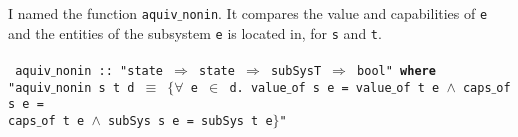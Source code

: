 \begin{enumerate}
I named the function \texttt{aquiv$\_$nonin}. It compares the value and capabilities of \texttt{e} and the entities of the subsystem \texttt{e} is located in, for \texttt{s} and \texttt{t}. \\ \\
{
\texttt{
aquiv$\_$nonin :: "state $\Rightarrow$ state $\Rightarrow$ subSysT $\Rightarrow$ bool" \textbf{where} \\
"aquiv$\_$nonin s t d $\equiv$ $\{\forall$ e $\in$ d. value$\_$of s e = value$\_$of t e $\wedge$ caps$\_$of s e = \\
 caps$\_$of t e $\wedge$ subSys s e = subSys t e$\}$"}} 
\end{enumerate}